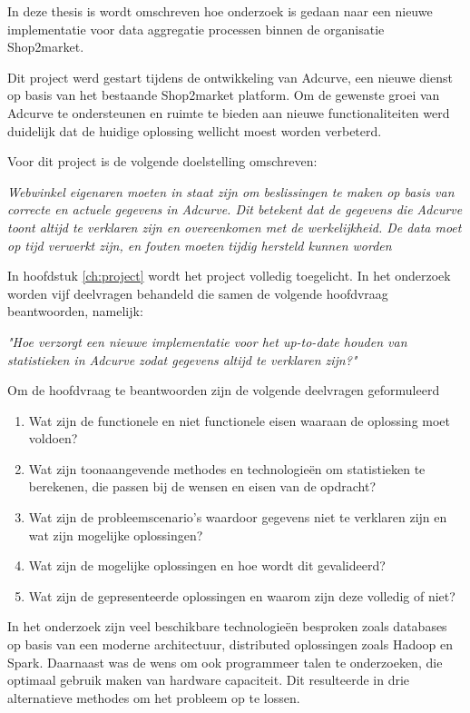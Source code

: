 
In deze thesis is wordt omschreven hoe onderzoek is gedaan naar een nieuwe implementatie voor data aggregatie processen binnen de organisatie Shop2market.

Dit project werd gestart tijdens de ontwikkeling van Adcurve, een nieuwe dienst op basis van het bestaande Shop2market platform. Om de gewenste groei van Adcurve te ondersteunen en ruimte te bieden aan nieuwe functionaliteiten werd duidelijk dat de huidige oplossing wellicht moest worden verbeterd.

Voor dit project is de volgende doelstelling omschreven:

\textit{Webwinkel eigenaren moeten in staat zijn om beslissingen te maken op basis van correcte en actuele gegevens in Adcurve. Dit betekent dat de gegevens die Adcurve toont altijd te verklaren zijn en overeenkomen met de werkelijkheid. De data moet op tijd verwerkt zijn, en fouten moeten tijdig hersteld kunnen worden}


In hoofdstuk \ref{ch:project} wordt het project volledig toegelicht. In het onderzoek worden vijf deelvragen behandeld die samen de volgende hoofdvraag beantwoorden, namelijk:

\medskip
{\large \textit{"Hoe verzorgt een nieuwe implementatie voor het up-to-date houden van statistieken in Adcurve zodat gegevens altijd te verklaren zijn?"}}
\medskip

Om de hoofdvraag te beantwoorden zijn de volgende deelvragen geformuleerd

\begin{enumerate}
\item Wat zijn de functionele en niet functionele eisen waaraan de oplossing moet voldoen?
\item Wat zijn toonaangevende methodes en technologieën om statistieken te berekenen, die passen bij de wensen en eisen van de opdracht?
\item Wat zijn de probleemscenario's waardoor gegevens niet te verklaren zijn en wat zijn mogelijke oplossingen?
\item Wat zijn de mogelijke oplossingen en hoe wordt dit gevalideerd?
\item Wat zijn de gepresenteerde oplossingen en waarom zijn deze volledig of niet?
\end{enumerate}


In het onderzoek zijn veel beschikbare technologieën besproken zoals databases op basis van een moderne architectuur, distributed oplossingen zoals Hadoop en Spark. Daarnaast was de wens om ook programmeer talen te onderzoeken, die optimaal gebruik maken van hardware capaciteit. Dit resulteerde in drie alternatieve methodes om het probleem op te lossen.

